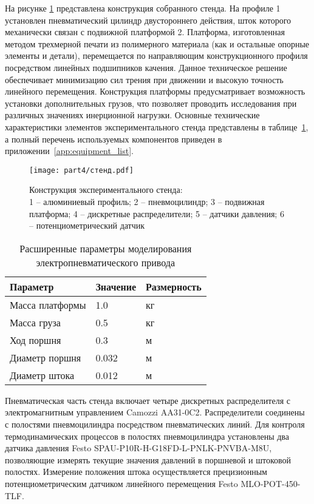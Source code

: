 На рисунке \ref{fig:experimental_stand} представлена конструкция собранного стенда.
На профиле 1 установлен пневматический цилиндр двустороннего действия, шток которого механически связан
с подвижной платформой 2. Платформа, изготовленная методом трехмерной печати из полимерного материала
(как и остальные опорные элементы и детали),
перемещается по направляющим конструкционного профиля посредством линейных подшипников качения. Данное
техническое решение обеспечивает минимизацию сил трения при движении и высокую точность линейного перемещения.
Конструкция платформы предусматривает возможность установки дополнительных грузов, что позволяет проводить
исследования при различных значениях инерционной нагрузки.
Основные технические характеристики элементов экспериментального стенда представлены в таблице~\ref{tab:stand_parameters},
а полный перечень используемых компонентов приведен в приложении~\ref{app:equipment_list}.

\begin{figure}[ht]
	\centering
	\texttt{[image: part4/стенд.pdf]}
	\caption{Конструкция экспериментального стенда:\\1 -- алюминиевый профиль;
		2 -- пневмоцилиндр; 3 -- подвижная платформа; 4 -- дискретные распределители;
		5 -- датчики давления; 6 -- потенциометрический датчик}
	\label{fig:experimental_stand}
\end{figure}

\begin{table}[h]
	\centering
	\caption{Расширенные параметры моделирования электропневматического привода}
	\small
	\begin{tabular}{lll}
		\textbf{Параметр} & \textbf{Значение} & \textbf{Размерность} \\
		\midrule
		Масса платформы   & \num{1.0}         & кг                   \\
		Масса груза       & \num{0.5}         & кг                   \\
		Ход поршня        & \num{0.3}         & м                    \\
		Диаметр поршня    & \num{0.032}       & м                    \\
		Диаметр штока     & \num{0.012}       & м                    \\
		\midrule
	\end{tabular}
	\label{tab:stand_parameters}
\end{table}


Пневматическая часть стенда включает четыре дискретных распределителя с электромагнитным
управлением Camozzi AA31-0C2. Распределители соединены с полостями пневмоцилиндра посредством пневматических линий.
Для контроля термодинамических процессов в полостях пневмоцилиндра установлены два датчика давления Festo SPAU-P10R-H-G18FD-L-PNLK-PNVBA-M8U,
позволяющие измерять текущие значения давлений в поршневой и штоковой полостях. Измерение положения
штока осуществляется прецизионным потенциометрическим датчиком линейного перемещения Festo MLO-POT-450-TLF.

